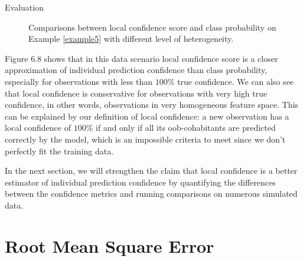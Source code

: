 \documentclass[12pt]{pom_thesis}
\begin{document}
\begin{chapter}{Evaluation}
\begin{figure}[h]
\centering
{}
\label{fig6}
\caption{Comparisons between local confidence score and class probability on Example \ref{example5} with different level of heterogeneity.}
\end{figure}

Figure 6.8 shows that in this data scenario local confidence score is a closer approximation of individual prediction confidence than class probability, especially for observations with less than $100\%$ true confidence. We can also see that local confidence is conservative for observations with very high true confidence, in other words, observations in very homogeneous feature space. This can be explained by our definition of local confidence: a new observation has a local confidence of $100\%$ if and only if all its oob-cohabitants are predicted correctly by the model, which is an impossible criteria to meet since we don't perfectly fit the training data.  

In the next section, we will strengthen the claim that local confidence is a better estimator of individual prediction confidence by quantifying the differences between the confidence metrics and running comparisons on numerous simulated data. 

\section{Root Mean Square Error}


\end{chapter}
\end{document}
